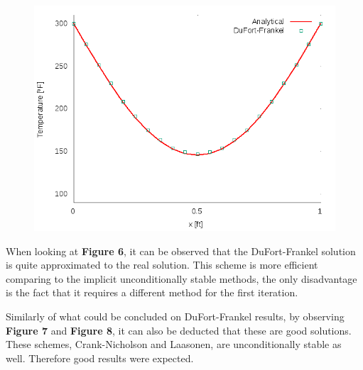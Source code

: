 \documentclass[12pt]{report}
\begin{document}
\begin{figure}[!htb]
  \centering
  \includegraphics[width=.5\linewidth]{DuFort-Frankelt_0_5.png}
\end{figure}
\pagebreak

\par When looking at \textbf{Figure 6}, it can be observed that the DuFort-Frankel solution is quite approximated to the real solution. This scheme is more efficient comparing to the implicit unconditionally stable methods, the only disadvantage is the fact that it requires a different method for the first iteration.

\par Similarly of what could be concluded on DuFort-Frankel results, by observing \textbf{Figure 7} and \textbf{Figure 8}, it can also be deducted that these are good solutions. These schemes, Crank-Nicholson and Laasonen, are unconditionally stable as well. Therefore good results were expected.
\end{document}
